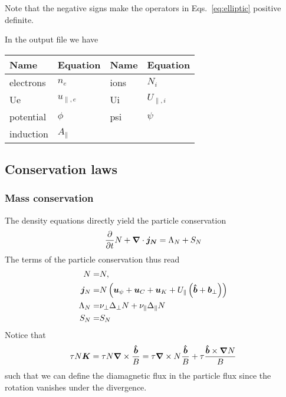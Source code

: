 Note that the negative signs make the operators in Eqs.~\eqref{eq:elliptic} positive definite.

In the output file we have
\begin{longtable}{llll}
\toprule
\rowcolor{gray!50}\textbf{Name} &  \textbf{Equation} & \textbf{Name} &  \textbf{Equation}\\
\midrule
    electrons &$n_e$ &
    ions &$N_i$ \\
    Ue &$u_{\parallel,e}$ &
    Ui &$U_{\parallel,i}$ \\
    potential &$\phi$ &
    psi &$\psi$ \\
    induction &$A_\parallel$ & \\
\bottomrule
\end{longtable}
\subsection{Conservation laws} \label{sec:conservation}
\subsubsection{Mass conservation}
The density equations directly yield the particle conservation
\begin{align} \label{eq:mass_theorem}
  \frac{\partial}{\partial t} N
  + {\boldsymbol{\nabla}}\cdot{\boldsymbol{ j_{N}}}
  =  \Lambda_{N}+S_{N}
\end{align}
The terms of the particle conservation thus read
\begin{align}
  N= & N,\\
  {\boldsymbol{j}}_{N} =& N\left(
  {\boldsymbol{u}}_\psi + {\boldsymbol{u}}_C + {\boldsymbol{u}}_{K} +U_\parallel\left(\bm{\hat{b}}+{{\boldsymbol{b}}}_\perp\right)  \right)
\label{eq:particle_flux}\\
  \Lambda_{N} =&
  \nu_\perp\Delta_\perp N + \nu_\parallel\Delta_\parallel N
\\
  S_{N} =&  S_{N}
\end{align}
Notice that
\begin{align}
\tau N {\boldsymbol{K}} = \tau N{\boldsymbol{\nabla}}\times\frac{\bm{\hat{b}}}{B} = \tau {\boldsymbol{\nabla}}\times N\frac{\bm{\hat{b}}}{B} + \tau \frac{\bm{\hat{b}}\times{\boldsymbol{\nabla}} N}{B}
\label{}
\end{align}
such that we can define the diamagnetic flux in the particle flux since
the rotation vanishes under the divergence.

